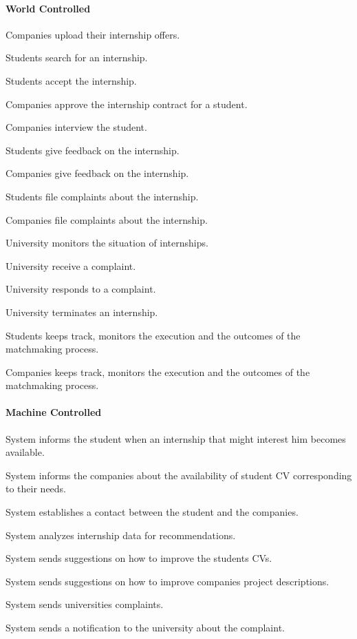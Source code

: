 \paragraph{World Controlled}
\begin{s-phenomena}
    \item Companies upload their internship offers.
    \item Students search for an internship.
    \item Students accept the internship.
    \item Companies approve the internship contract for a student.
    \item Companies interview the student.
    \item Students give feedback on the internship.
    \item Companies give feedback on the internship.
    \item Students file complaints about the internship.
    \item Companies file complaints about the internship.
    \item University monitors the situation of internships.
    \item University receive a complaint.
    \item University responds to a complaint.
    \item University terminates an internship.
    \item Students keeps track, monitors the execution and the outcomes of the matchmaking process.
    \item Companies keeps track, monitors the execution and the outcomes of the matchmaking process.
\end{s-phenomena}
\paragraph{Machine Controlled}
\begin{s-phenomena}[resume]
    \item System informs the student when an internship that might interest him becomes available.
    \item System informs the companies about the availability of student CV corresponding to their needs.
    \item System establishes a contact between the student and the companies.
    \item System analyzes internship data for recommendations.
    \item System sends suggestions on how to improve the students CVs.
    \item System sends suggestions on how to improve companies project descriptions.
    \item System sends universities complaints.
    \item System sends a notification to the university about the complaint.
\end{s-phenomena}
